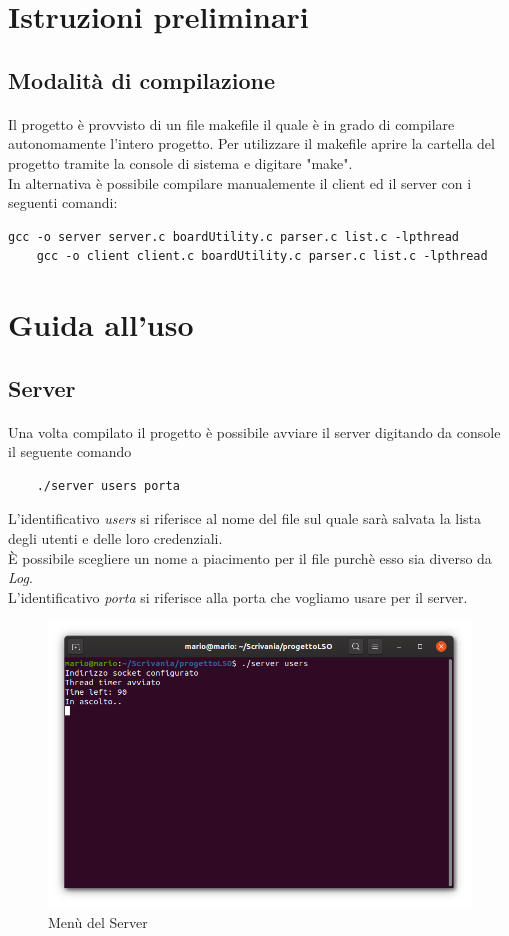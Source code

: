 \documentclass[a4paper]{article}
\begin{document}
\section{Istruzioni preliminari}
\subsection{Modalità di compilazione}
\paragraph{}
Il progetto è provvisto di un file makefile il quale è in grado di compilare autonomamente l'intero progetto.
Per utilizzare il makefile aprire la cartella del progetto tramite la console di sistema e digitare "make".\\
In alternativa è possibile compilare manualemente il client ed il server con i seguenti comandi:
\begin{Verbatim}[fontsize=\small]
    gcc -o server server.c boardUtility.c parser.c list.c -lpthread
    gcc -o client client.c boardUtility.c parser.c list.c -lpthread
\end{Verbatim}
\section{Guida all'uso }
\subsection{Server}
\paragraph{}
Una volta compilato il progetto è possibile avviare il server digitando da console il seguente comando
\begin{verbatim}
    ./server users porta
\end{verbatim}
L'identificativo \textit{users} si riferisce al nome del file sul quale sarà salvata la lista degli utenti e delle loro credenziali.\\
È possibile scegliere un nome a piacimento per il file purchè esso sia diverso da \textit{Log}.\\
L'identificativo \textit{porta} si riferisce alla porta che vogliamo usare per il server.
\begin{figure}[H]
  \includegraphics[width=\textwidth]{Server}
  \caption{Menù del Server}
\end{figure}
\end{document}
